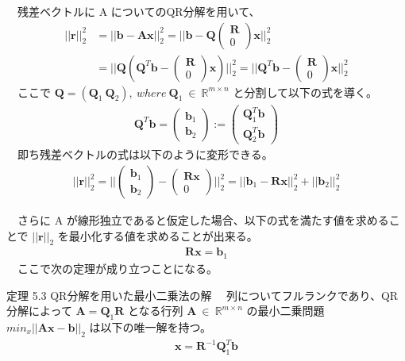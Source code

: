 \documentclass[dvipdfmx,10pt,presentation]{beamer}
\begin{document}
\begin{frame}[allowframebreaks]{}
　残差ベクトルに A についてのQR分解を用いて、\\
\begin{align*}
||\bm{r}||_2^2&=||\bm{b}-\bm{A}\bm{x}||_2^2=||\bm{b}-\bm{Q}\begin{pmatrix}\bm{R}\\0\end{pmatrix}\bm{x}||^2_2 \\
&=||\bm{Q}(\bm{Q}^T\bm{b}-\begin{pmatrix}\bm{R}\\0\end{pmatrix}\bm{x})||^2_2=||\bm{Q}^T\bm{b}-\begin{pmatrix}\bm{R}\\0\end{pmatrix}\bm{x}||^2_2
\end{align*}
　ここで \(\bm{Q}=(\bm{Q}_1\ \bm{Q}_2),\ where\ \bm{Q}_1\ \in\ \mathbb{R}^{m\times n}\) と分割して以下の式を導く。\\
 \begin{align*}
\bm{Q}^T\bm{b}=\begin{pmatrix}\bm{b}_1\\\bm{b}_2\end{pmatrix}:=\begin{pmatrix}\bm{Q}^T_1\bm{b}\\\bm{Q}^T_2\bm{b}\end{pmatrix}
\end{align*}
　即ち残差ベクトルの式は以下のように変形できる。\\
\begin{align}
||\bm{r}||^2_2=||\begin{pmatrix}\bm{b}_1\\\bm{b}_2\end{pmatrix}-\begin{pmatrix}\bm{R}\bm{x}\\0\end{pmatrix}||^2_2=||\bm{b}_1-\bm{R}\bm{x}||^2_2+||\bm{b}_2||^2_2
\tag{5.4}
\end{align}

　さらに A が線形独立であると仮定した場合、以下の式を満たす値を求めることで \(||\bm{r}||_2\) を最小化する値を求めることが出来る。\\
\begin{align*}
\bm{R}\bm{x}=\bm{b}_1
\end{align*}
　ここで次の定理が成り立つことになる。\\

\begin{block}{定理 5.3 QR分解を用いた最小二乗法の解}
　列についてフルランクであり、QR分解によって \(\bm{A}=\bm{Q}_1\bm{R}\) となる行列 \(\bm{A}\ \in\ \mathbb{R}^{m\times n}\) の最小二乗問題 \(min_x||\bm{A}\bm{x}-\bm{b}||_2\) は以下の唯一解を持つ。\\
\begin{align*}
\bm{x}=\bm{R}^{-1}\bm{Q}_1^T\bm{b}
\end{align*}
\end{block}
\end{frame}
\end{document}
